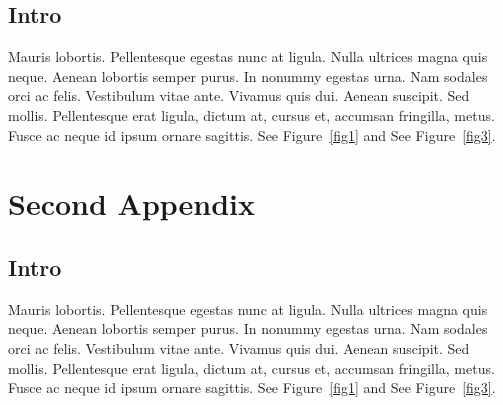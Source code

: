 \documentclass{report}
\begin{document}
\section{Intro}
Mauris lobortis. Pellentesque egestas nunc at ligula. Nulla ultrices magna quis
neque. Aenean lobortis semper purus. In nonummy egestas urna. Nam sodales orci
ac felis. Vestibulum vitae ante. Vivamus quis dui. Aenean suscipit. Sed mollis.
Pellentesque erat ligula, dictum at, cursus et, accumsan fringilla, metus. Fusce
ac neque id ipsum ornare sagittis.  See Figure~\ref{fig1} and See Figure~\ref{fig3}.

\chapter{Second Appendix}

\section{Intro}
Mauris lobortis. Pellentesque egestas nunc at ligula. Nulla ultrices magna quis
neque. Aenean lobortis semper purus. In nonummy egestas urna. Nam sodales orci
ac felis. Vestibulum vitae ante. Vivamus quis dui. Aenean suscipit. Sed mollis.
Pellentesque erat ligula, dictum at, cursus et, accumsan fringilla, metus. Fusce
ac neque id ipsum ornare sagittis.  See Figure~\ref{fig1} and See Figure~\ref{fig3}.
\end{document}
